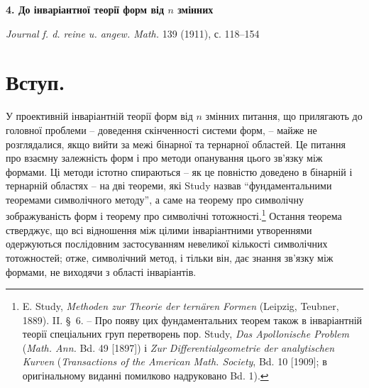 \documentclass[11pt]{article}
\begin{document}
\begin{center}
{\Large\bfseries 4. До інваріантної теорії форм від $n$ змінних}\par
\vspace{1.2em}
\emph{Journal f. d. reine u. angew. Math.} 139 (1911), с. 118--154
\end{center}

\section*{Вступ.}
У проективній інваріантній теорії форм від $n$ змінних питання, що прилягають до головної проблеми -- доведення скінченності системи форм, -- майже не розглядалися, якщо вийти за межі бінарної та тернарної областей. Це питання про взаємну залежність форм і про методи опанування цього зв'язку між формами. Ці методи істотно спираються -- як це повністю доведено в бінарній і тернарній областях -- на дві теореми, які Study назвав ``фундаментальними теоремами символічного методу'', а саме на теорему про символічну зображуваність форм і теорему про символічні тотожності.\footnote{E. Study, \emph{Methoden zur Theorie der ternären Formen} (Leipzig, Teubner, 1889). II. \S\ 6. -- Про появу цих фундаментальних теорем також в інваріантній теорії спеціальних груп перетворень пор. Study, \emph{Das Apollonische Problem} (\emph{Math. Ann.} Bd. 49 [1897]) і \emph{Zur Differentialgeometrie der analytischen Kurven} (\emph{Transactions of the American Math. Society}, Bd. 10 [1909]; в оригінальному виданні помилково надруковано Bd. 1).} Остання теорема стверджує, що всі відношення між цілими інваріантними утвореннями одержуються послідовним застосуванням невеликої кількості символічних тотожностей; отже, символічний метод, і тільки він, дає знання зв'язку між формами, не виходячи з області інваріантів.
\end{document}
